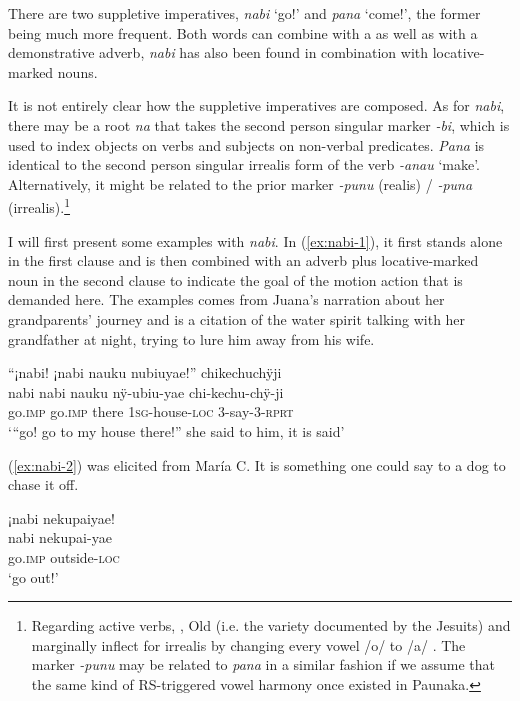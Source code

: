 There are two suppletive imperatives, \textit{nabi} ‘go!’ and \textit{pana} ‘come!’, the former being much more frequent. Both words can combine with a  as well as with a demonstrative adverb, \textit{nabi} has also been found in combination with locative-marked nouns.

It is not entirely clear how the suppletive imperatives are composed. As for \textit{nabi}, there may be a root \textit{na} that takes the second person singular marker \textit{-bi}, which is used to index objects on verbs and subjects on non-verbal predicates. \textit{Pana} is identical to the second person singular irrealis form of the verb \textit{-anau} ‘make’. Alternatively, it might be related to the prior  marker \textit{-punu} (realis) / \textit{-puna} (irrealis).\footnote{Regarding active verbs, , Old  (i.e. the  variety documented by the Jesuits) and marginally  inflect for irrealis by changing every vowel /o/ to /a/ \citep[103]{DanielsenTerhartSubm}. The marker \textit{-punu} may be related to \textit{pana} in a similar fashion if we assume that the same kind of RS-triggered vowel harmony once existed in Paunaka.}

I will first present some examples with \textit{nabi}. In (\ref{ex:nabi-1}), it first stands alone in the first clause and is then combined with an adverb plus locative-marked noun in the second clause to indicate the goal of the motion action that is demanded here. The examples comes from Juana’s narration about her grandparents’ journey and is a citation of the water spirit talking with her grandfather at night, trying to lure him away from his wife.

\ea\label{ex:nabi-1}
\begingl
\glpreamble “¡nabi! ¡nabi nauku nubiuyae!” chikechuchÿji\\
\gla nabi nabi nauku nÿ-ubiu-yae chi-kechu-chÿ-ji\\
\glb go.\textsc{imp} go.\textsc{imp} there 1\textsc{sg}-house-\textsc{loc} 3-say-3-\textsc{rprt}\\
\glft ‘“go! go to my house there!” she said to him, it is said’
\endgl
\trailingcitation{[jxx-p151016l-2.195]}
\xe

(\ref{ex:nabi-2}) was elicited from María C. It is something one could say to a dog to chase it off.

\ea\label{ex:nabi-2}
\begingl
\glpreamble ¡nabi nekupaiyae!\\
\gla nabi nekupai-yae\\
\glb go.\textsc{imp} outside-\textsc{loc}\\
\glft ‘go out!’
\endgl
\trailingcitation{[uxx-e120427l.078]}
\xe


